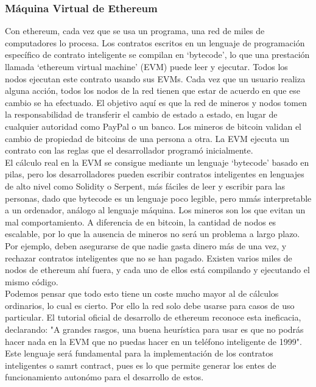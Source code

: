 \documentclass[11pt,a4paper]{article}
\begin{document}
\subsubsection{Máquina Virtual de Ethereum}
Con ethereum, cada vez que se usa un programa, una red de miles de computadores lo procesa. Los contratos escritos en un lenguaje de programación específico de contrato inteligente se compilan en ‘bytecode’, lo que una prestación llamada ‘ethereum virtual machine’ (EVM) puede leer y ejecutar. Todos los nodos ejecutan este contrato usando sus EVMs.  Cada vez que un usuario realiza alguna acción, todos los nodos de la red tienen que estar de acuerdo en que ese cambio se ha efectuado.
El objetivo aquí es que la red de mineros y nodos tomen la responsabilidad de transferir el cambio de estado a estado, en lugar de cualquier autoridad como PayPal o un banco. Los mineros de bitcoin validan el cambio de propiedad de bitcoins de una persona a otra. La EVM ejecuta un  contrato con las reglas que el desarrollador programó inicialmente. \\

El cálculo real en la EVM se consigue mediante un lenguaje ‘bytecode’ basado en pilas, pero los desarrolladores pueden escribir contratos inteligentes en lenguajes de alto nivel como Solidity o Serpent, más fáciles de leer y escribir para las personas, dado que bytecode es un lenguaje poco legible, pero mmás interpretable a un ordenador, análogo al lenguaje máquina. Los mineros son los que evitan un mal comportamiento. A diferencia de en bitcoin, la cantidad de nodos es escalable, por lo que la ausencia de mineros no será un problema a largo plazo. Por ejemplo, deben asegurarse de que
nadie gasta dinero más de una vez, y rechazar contratos inteligentes que no se han pagado. Existen varios miles de nodos de ethereum ahí fuera, y cada uno de ellos está compilando y ejecutando el mismo código.\\

Podemos pensar que todo esto tiene un coste mucho mayor al de cálculos ordinarios, lo cual es cierto. Por ello la red solo debe usarse para casos de uso particular. El tutorial oficial de desarrollo de ethereum reconoce esta ineficacia, declarando:
"A grandes rasgos, una buena heurística para usar es que no podrás hacer nada en la EVM que no puedas hacer en un teléfono inteligente de 1999".\\

Este lenguaje será fundamental para la implementación de los contratos inteligentes o samrt contract, pues es lo que permite generar los entes de funcionamiento autonómo para el desarrollo de estos.
\end{document}
